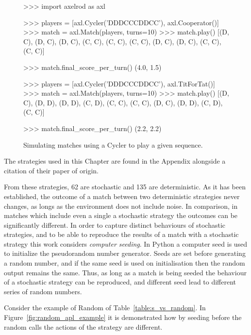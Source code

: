 \begin{figure}[!htbp]
    \begin{usagepy}
>>> import axelrod as axl

>>> players = [axl.Cycler('DDDCCCDDCC'), axl.Cooperator()]
>>> match = axl.Match(players, turns=10)
>>> match.play()
[(D, C),
 (D, C),
 (D, C),
 (C, C),
 (C, C),
 (C, C),
 (D, C),
 (D, C),
 (C, C),
 (C, C)]

>>> match.final_score_per_turn()
(4.0, 1.5)

>>> players = [axl.Cycler('DDDCCCDDCC'), axl.TitForTat()]
>>> match = axl.Match(players, turns=10)
>>> match.play()
[(D, C),
 (D, D),
 (D, D),
 (C, D),
 (C, C),
 (C, C),
 (D, C),
 (D, D),
 (C, D),
 (C, C)]

 >>> match.final_score_per_turn()
 (2.2, 2.2)
    \end{usagepy}
\caption{Simulating matches using a Cycler to play a given sequence.}\label{fig:apl_simulations_cycler}
\end{figure}

The \numberofstrategiesbestsequences strategies used in this Chapter are found
in the Appendix alongside a citation of their paper of origin.

From these \numberofstrategiesbestsequences strategies, 62 are stochastic and
135 are deterministic. As it has been established, the outcome of a match
between two deterministic strategies never changes, as longs as the environment
does not include noise. In comparison, in matches which include even a single a
stochastic strategy the outcomes can be significantly different. In order to
capture distinct behaviours of stochastic strategies, and to be able to
reproduce the results of a match with a stochastic strategy this work considers
\textit{computer seeding}. In Python a computer seed is used to initialize the
pseudorandom number generator. Seeds are set before generating a random number,
and if the same seed is used on initialisation then the random output remains
the same. Thus, as long as a match is being seeded the behaviour of a stochastic
strategy can be reproduced, and different seed lead to different series of
random numbers.

Consider the example of Random of Table~\ref{table:s_vs_random}. In
Figure~\ref{fig:random_apl_example} it is demonstrated how by seeding before the
random calls the actions of the strategy are different.

